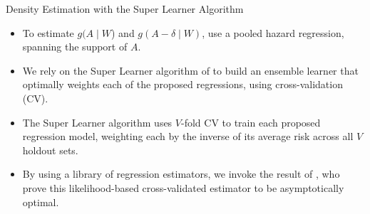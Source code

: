 \documentclass{beamer}
\begin{document}
\begin{frame}[c]{Density Estimation with the Super Learner Algorithm}

\begin{center}
\begin{itemize}
  \itemsep10pt
  \item To estimate $g(A \mid W$) and $g(A - \delta \mid W)$, use a pooled
    hazard regression, spanning the support of $A$.
  \item We rely on the Super Learner algorithm of \cite{vdl2007super} to build
    an ensemble learner that optimally weights each of the proposed regressions,
    using cross-validation (CV).
  \item The Super Learner algorithm uses $V$-fold CV to train each proposed
    regression model, weighting each by the inverse of its average risk across
    all $V$ holdout sets.
  \item By using a library of regression estimators, we invoke the result of
    \cite{vdl2004asymptotic}, who prove this likelihood-based cross-validated
    estimator to be asymptotically optimal.
\end{itemize}
\end{center}


\end{frame}

\end{document}
